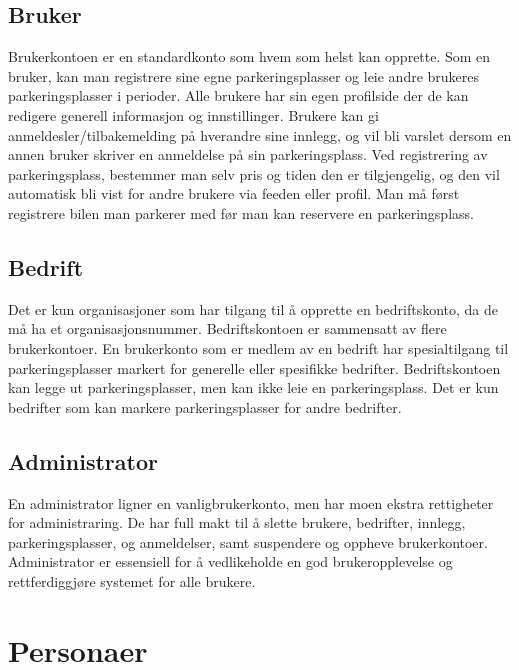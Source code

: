 \documentclass[12pt]{article}
\begin{document}
    \subsection{Bruker}
    Brukerkontoen er en standardkonto som hvem som helst kan opprette. Som en bruker, kan man registrere sine egne parkeringsplasser og leie andre brukeres parkeringsplasser i perioder. Alle brukere har sin egen profilside der de kan redigere generell informasjon og innstillinger. Brukere kan gi anmeldesler/tilbakemelding på hverandre sine innlegg, og vil bli varslet dersom en annen bruker skriver en anmeldelse på sin parkeringsplass. Ved registrering av parkeringsplass, bestemmer man selv pris og tiden den er tilgjengelig, og den vil automatisk bli vist for andre brukere via feeden eller profil. Man må først registrere bilen man parkerer med før man kan reservere en parkeringsplass.

    \subsection{Bedrift}
    Det er kun organisasjoner som har tilgang til å opprette en bedriftskonto, da de må ha et organisasjonsnummer. Bedriftskontoen er sammensatt av flere brukerkontoer. En brukerkonto som er medlem av en bedrift har spesialtilgang til parkeringsplasser markert for generelle eller spesifikke bedrifter. Bedriftskontoen kan legge ut parkeringsplasser, men kan ikke leie en parkeringsplass. Det er kun bedrifter som kan markere parkeringsplasser for andre bedrifter.

    \subsection{Administrator}
    En administrator ligner en vanligbrukerkonto, men har moen ekstra rettigheter for administraring. De har full makt til å slette brukere, bedrifter, innlegg, parkeringsplasser, og anmeldelser, samt suspendere og oppheve brukerkontoer. Administrator er essensiell for å vedlikeholde en god brukeropplevelse og rettferdiggjøre systemet for alle brukere.

\section{Personaer}
\end{document}
